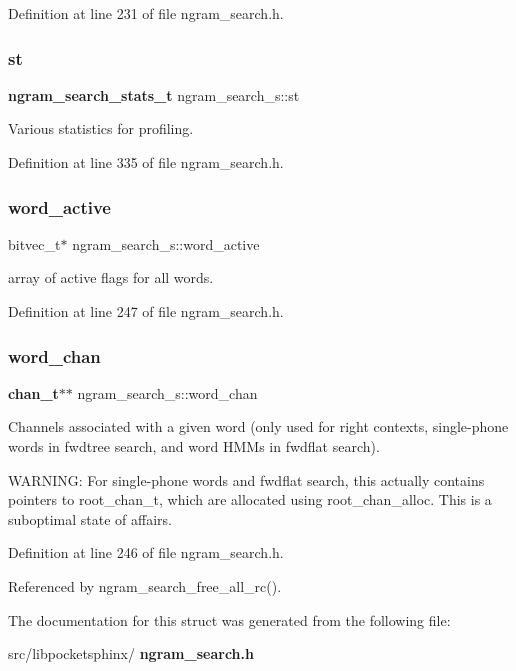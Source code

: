 Definition at line 231 of file ngram\+\_\+search.\+h.

\mbox{\label{structngram__search__s_a5758d167fbb48e824a6a58186620e06d}} 
\subsubsection{st}
{\footnotesize\ttfamily \textbf{ ngram\+\_\+search\+\_\+stats\+\_\+t} ngram\+\_\+search\+\_\+s\+::st}



Various statistics for profiling. 



Definition at line 335 of file ngram\+\_\+search.\+h.

\mbox{\label{structngram__search__s_aeb4c98851bf9b239ca607ca59f59ff4c}} 
\subsubsection{word\+\_\+active}
{\footnotesize\ttfamily bitvec\+\_\+t$\ast$ ngram\+\_\+search\+\_\+s\+::word\+\_\+active}



array of active flags for all words. 



Definition at line 247 of file ngram\+\_\+search.\+h.

\mbox{\label{structngram__search__s_a79deb7295a261cd82d2a6b48cb119e77}} 
\subsubsection{word\+\_\+chan}
{\footnotesize\ttfamily \textbf{ chan\+\_\+t}$\ast$$\ast$ ngram\+\_\+search\+\_\+s\+::word\+\_\+chan}



Channels associated with a given word (only used for right contexts, single-\/phone words in fwdtree search, and word H\+M\+Ms in fwdflat search). 

W\+A\+R\+N\+I\+NG\+: For single-\/phone words and fwdflat search, this actually contains pointers to root\+\_\+chan\+\_\+t, which are allocated using root\+\_\+chan\+\_\+alloc. This is a suboptimal state of affairs. 

Definition at line 246 of file ngram\+\_\+search.\+h.



Referenced by ngram\+\_\+search\+\_\+free\+\_\+all\+\_\+rc().



The documentation for this struct was generated from the following file\+:\begin{DoxyCompactItemize}
\item 
src/libpocketsphinx/\textbf{ ngram\+\_\+search.\+h}\end{DoxyCompactItemize}
